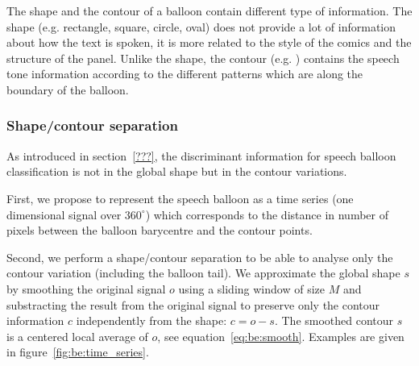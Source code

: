 The shape and the contour of a balloon contain different type of information.
The shape (e.g. rectangle, square, circle, oval) does not provide a lot of information about how the text is spoken, it is more related to the style of the comics and the structure of the panel.
Unlike the shape, the contour (e.g. ) contains the speech tone information according to the different patterns which are along the boundary of the balloon.




\subsubsection{Shape/contour separation}
\label{sec:contour_detection}
As introduced in section~\ref{???}, the discriminant information for speech balloon classification is not in the global shape but in the contour variations. 

First, we propose to represent the speech balloon as a time series (one dimensional signal over $360^\circ$) which corresponds to the distance in number of pixels between the balloon barycentre and the contour points. 

Second, we perform a shape/contour separation to be able to analyse only the contour variation (including the balloon tail). We approximate the global shape $s$ by smoothing the original signal $o$ using a sliding window of size $M$ and substracting the result from the original signal to preserve only the contour information $c$ independently from the shape: $c = o - s$. The smoothed contour $s$ is a centered local average of $o$, see equation~\ref{eq:be:smooth}. Examples are given in figure~\ref{fig:be:time_series}.


